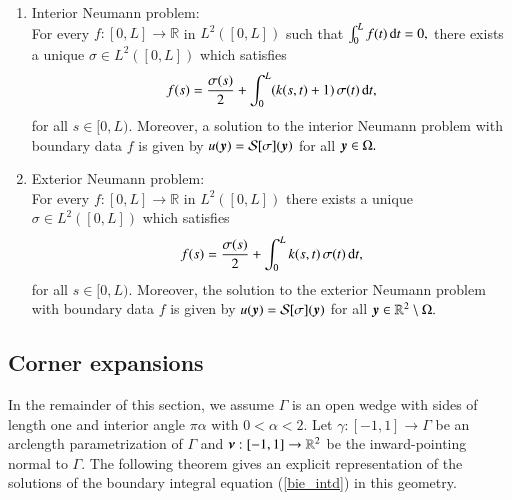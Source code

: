 {\begin{enumerate}
\item Interior Neumann problem:\\ 
For every  $f:[0,L] \rightarrow \mathbb{R}$ in $L^{2}([0,L])$ such that $\int_{0}^{L} f(t)\,{\rm d}t = 0,$ there exists a unique $\sigma \in L^{2}([0,L])$ which satisfies
\begin{align}
f(s)=  \frac{\sigma(s)}{2}+ \int_0^L (k(s,t) + 1)\,\sigma(t)\,{\rm d}t,
\label{bie_intn}
\end{align}
for all $s \in [0,L).$ Moreover, a solution to the interior Neumann problem with boundary data $f$ is given by $u(\boldsymbol{y}) = \mathcal{S}[\sigma](\boldsymbol{y})$ for all $\boldsymbol{y} \in \Omega.$


\item Exterior Neumann problem:\\
For every $f:[0,L] \rightarrow \mathbb{R}$ in $L^{2}([0,L])$ there exists a unique $\sigma \in L^{2}([0,L])$ which satisfies
\begin{align}
f(s)=  \frac{\sigma(s)}{2}+ \int_0^L k(s,t) \,\sigma(t)\,{\rm d}t,
\label{bie_extn}
\end{align}
for all $s \in [0,L).$ Moreover, the solution to the exterior Neumann problem with boundary data $f$ is given by $u(\boldsymbol{y}) = \mathcal{S}[\sigma](\boldsymbol{y})$ for all $\boldsymbol{y} \in \mathbb{R}^{2} \setminus \Omega.$
\end{enumerate}
}

\subsection{Corner expansions}

In the remainder of this section, we assume $\Gamma$ is an open wedge with sides of length one and interior angle $\pi \alpha$ with $0 <\alpha<2.$ Let $\gamma:[-1,1] \rightarrow \Gamma$ be an arclength parametrization of $\Gamma$ and $\boldsymbol{\nu}:[-1,1] \rightarrow \mathbb{R}^2$ be the inward-pointing normal to $\Gamma.$ 
The following theorem  gives an explicit representation of the solutions of the boundary integral equation (\ref{bie_intd}) in this geometry.

